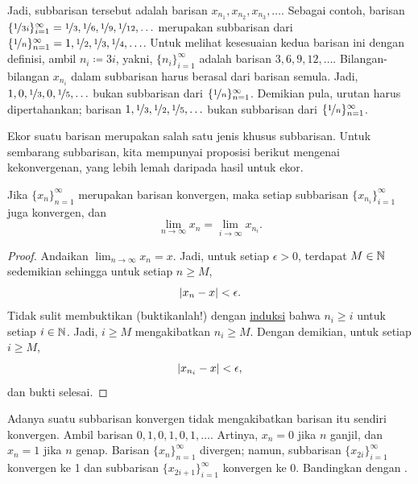 Jadi, subbarisan tersebut adalah barisan $x_{n_1},x_{n_2},x_{n_3},\ldots$.
Sebagai contoh,
barisan
$\{ \nicefrac{1}{3i} \}_{i=1}^\infty
= \nicefrac{1}{3},\nicefrac{1}{6},\nicefrac{1}{9},\nicefrac{1}{12},\ldots$
merupakan subbarisan dari
$\{ \nicefrac{1}{n} \}_{n=1}^\infty
= 1, \nicefrac{1}{2},\nicefrac{1}{3},\nicefrac{1}{4},\ldots$.
Untuk melihat kesesuaian kedua
barisan ini dengan definisi, ambil $n_i \coloneqq 3i$,
yakni, $\{ n_i \}_{i=1}^\infty$ adalah
barisan $3,6,9,12,\ldots$.  
Bilangan-bilangan $x_{n_i}$ dalam
subbarisan harus berasal dari barisan semula.  Jadi, $1,0,\nicefrac{1}{3},0,
\nicefrac{1}{5},\ldots$
bukan subbarisan dari $\{ \nicefrac{1}{n} \}_{n=1}^\infty$.  Demikian pula, urutan
harus dipertahankan;
barisan $1,\nicefrac{1}{3},\nicefrac{1}{2},\nicefrac{1}{5},\ldots$
bukan subbarisan dari $\{ \nicefrac{1}{n} \}_{n=1}^\infty$.

Ekor suatu barisan merupakan salah satu jenis khusus subbarisan.  Untuk sembarang
subbarisan, kita mempunyai proposisi berikut mengenai kekonvergenan,
yang lebih lemah daripada hasil untuk ekor.

\begin{prop} \label{prop:seqtosubseq}
Jika $\{ x_n \}_{n=1}^\infty$ merupakan barisan konvergen,
maka setiap subbarisan $\{ x_{n_i} \}_{i=1}^\infty$ juga konvergen, dan
\begin{equation*}
\lim_{n\to \infty} x_n = 
\lim_{i\to \infty} x_{n_i} .
\end{equation*}
\end{prop}

\begin{proof}
Andaikan $\lim_{n\to \infty} x_n = x$.  Jadi, untuk setiap
$\epsilon > 0$, terdapat $M \in {\mathbb{N}}$ sedemikian sehingga untuk setiap $n \geq M$,
\begin{equation*}
\lvert {x_n - x} \rvert < \epsilon .
\end{equation*}
Tidak sulit membuktikan (buktikanlah!) dengan \hyperref[induction:thm]{induksi} bahwa
$n_i \geq i$ untuk setiap $i \in {\mathbb{N}}$.  Jadi, $i \geq M$ mengakibatkan $n_i \geq M$.  Dengan demikian,
untuk setiap $i \geq M$,
\begin{equation*}
\lvert {x_{n_i} - x} \rvert < \epsilon ,
\end{equation*}
dan bukti selesai.
\end{proof}

\begin{example}
Adanya suatu subbarisan konvergen tidak mengakibatkan
barisan itu sendiri konvergen.
Ambil barisan $0,1,0,1,0,1,\ldots$.  Artinya,
$x_n = 0$ jika $n$ ganjil, dan $x_n = 1$ jika $n$ genap.  Barisan
$\{ x_n \}_{n=1}^\infty$ divergen; namun, subbarisan
$\{ x_{2i} \}_{i=1}^\infty$ konvergen ke 1 dan subbarisan
$\{ x_{2i+1} \}_{i=1}^\infty$ konvergen ke 0.  Bandingkan dengan .
\end{example}

